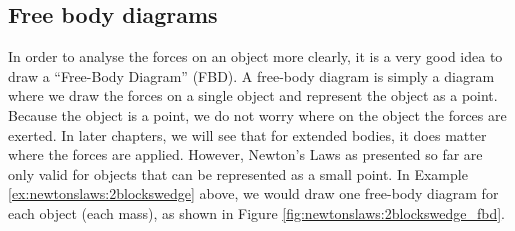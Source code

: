 \subsection{Free body diagrams}
In order to analyse the forces on an object more clearly, it is a very good idea to draw a ``Free-Body Diagram'' (FBD). A free-body diagram is simply a diagram where we draw the forces on a single object and represent the object as a point. Because the object is a point, we do not worry where on the object the forces are exerted. In later chapters, we will see that for extended bodies, it does matter where the forces are applied. However, Newton's Laws as presented so far are only valid for objects that can be represented as a small point.
In Example \ref{ex:newtonslaws:2blockswedge} above, we would draw one free-body diagram for each object (each mass), as shown in Figure \ref{fig:newtonslaws:2blockswedge_fbd}.
\vspace{-0.25cm}
